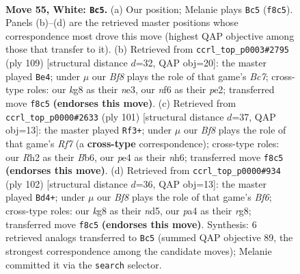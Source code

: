 \documentclass[11pt]{article}
\begin{document}
\clearpage

\begin{figure}[p]\centering
\begin{subfigure}{0.46\textwidth}\centering
\resizebox{\linewidth}{!}{%
\newchessgame
\chessboard[
  setfen={5Bk1/5p2/5n2/8/p3pK1p/P6P/3r1P1R/8 w - - 10 55},
  showmover=false,
  pgfstyle=straightmove, color=movearrow, markmove={f8-c5}
]}
\caption{}
\end{subfigure}\hfill
\begin{subfigure}{0.46\textwidth}\centering
\resizebox{\linewidth}{!}{%
\newchessgame
\chessboard[
  setfen={8/1p6/5pk1/8/2P2PP1/R3N3/p1b1PK2/r7 b - - 6 55},
  showmover=false,
  pgfstyle=straightmove, color=movearrow, markmove={c2-e4}
]}
\caption{}
\end{subfigure}
\\[4pt]
\begin{subfigure}{0.46\textwidth}\centering
\resizebox{\linewidth}{!}{%
\newchessgame
\chessboard[
  setfen={1R6/1p3p2/pb3k1N/6pP/P5P1/3K4/5r2/8 b - - 13 51},
  showmover=false,
  pgfstyle=straightmove, color=movearrow, markmove={f2-f3}
]}
\caption{}
\end{subfigure}\hfill
\begin{subfigure}{0.46\textwidth}\centering
\resizebox{\linewidth}{!}{%
\newchessgame
\chessboard[
  setfen={6r1/8/1p1k1B1R/p2n4/P4pP1/1P3K2/8/8 w - - 1 52},
  showmover=false,
  pgfstyle=straightmove, color=movearrow, markmove={f6-d4}
]}
\caption{}
\end{subfigure}
\caption{\textbf{Move 55, White: \texttt{Bc5}.} (a) Our position; Melanie plays \texttt{Bc5} (\texttt{f8c5}). Panels (b)--(d) are the retrieved master positions whose correspondence most drove this move (highest QAP objective among those that transfer to it). (b) Retrieved from \texttt{ccrl\_top\_p0003\#2795} (ply 109) [structural distance $d$=32, QAP obj=20]: the master played \texttt{Be4}; under $\mu$ our \emph{Bf8} plays the role of that game's \emph{Bc7}; cross-type roles: our \emph{k}g8 as their \emph{n}e3, our \emph{n}f6 as their \emph{p}e2; transferred move \texttt{f8c5} \textbf{(endorses this move)}. (c) Retrieved from \texttt{ccrl\_top\_p0000\#2633} (ply 101) [structural distance $d$=37, QAP obj=13]: the master played \texttt{Rf3+}; under $\mu$ our \emph{Bf8} plays the role of that game's \emph{Rf7} (a \textbf{cross-type} correspondence); cross-type roles: our \emph{R}h2 as their \emph{B}b6, our \emph{p}e4 as their \emph{n}h6; transferred move \texttt{f8c5} \textbf{(endorses this move)}. (d) Retrieved from \texttt{ccrl\_top\_p0000\#934} (ply 102) [structural distance $d$=36, QAP obj=13]: the master played \texttt{Bd4+}; under $\mu$ our \emph{Bf8} plays the role of that game's \emph{Bf6}; cross-type roles: our \emph{k}g8 as their \emph{n}d5, our \emph{p}a4 as their \emph{r}g8; transferred move \texttt{f8c5} \textbf{(endorses this move)}. Synthesis: 6 retrieved analogs transferred to \texttt{Bc5} (summed QAP objective 89, the strongest correspondence among the candidate moves); Melanie committed it via the \texttt{search} selector.}
\label{fig:thought-m108}
\end{figure}
\end{document}
